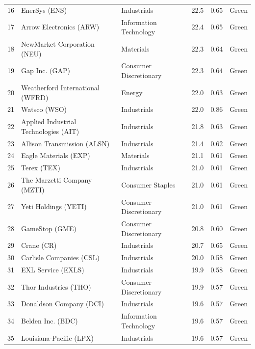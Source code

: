 \documentclass[11pt,a4paper]{article}
\begin{document}
{\begin{longtable}{r p{4.6cm} p{3cm} r r l}
16 & EnerSys (ENS) & Industrials & 22.5 & 0.65 & \cellcolor[HTML]{C6EFCE}Green \\
17 & Arrow Electronics (ARW) & Information Technology & 22.4 & 0.65 & \cellcolor[HTML]{C6EFCE}Green \\
18 & NewMarket Corporation (NEU) & Materials & 22.3 & 0.64 & \cellcolor[HTML]{C6EFCE}Green \\
19 & Gap Inc. (GAP) & Consumer Discretionary & 22.3 & 0.64 & \cellcolor[HTML]{C6EFCE}Green \\
20 & Weatherford International (WFRD) & Energy & 22.0 & 0.63 & \cellcolor[HTML]{C6EFCE}Green \\
21 & Watsco (WSO) & Industrials & 22.0 & 0.86 & \cellcolor[HTML]{C6EFCE}Green \\
22 & Applied Industrial Technologies (AIT) & Industrials & 21.8 & 0.63 & \cellcolor[HTML]{C6EFCE}Green \\
23 & Allison Transmission (ALSN) & Industrials & 21.4 & 0.62 & \cellcolor[HTML]{C6EFCE}Green \\
24 & Eagle Materials (EXP) & Materials & 21.1 & 0.61 & \cellcolor[HTML]{C6EFCE}Green \\
25 & Terex (TEX) & Industrials & 21.0 & 0.61 & \cellcolor[HTML]{C6EFCE}Green \\
26 & The Marzetti Company (MZTI) & Consumer Staples & 21.0 & 0.61 & \cellcolor[HTML]{C6EFCE}Green \\
27 & Yeti Holdings (YETI) & Consumer Discretionary & 21.0 & 0.61 & \cellcolor[HTML]{C6EFCE}Green \\
28 & GameStop (GME) & Consumer Discretionary & 20.8 & 0.60 & \cellcolor[HTML]{C6EFCE}Green \\
29 & Crane (CR) & Industrials & 20.7 & 0.65 & \cellcolor[HTML]{C6EFCE}Green \\
30 & Carlisle Companies (CSL) & Industrials & 20.0 & 0.58 & \cellcolor[HTML]{C6EFCE}Green \\
31 & EXL Service (EXLS) & Industrials & 19.9 & 0.58 & \cellcolor[HTML]{C6EFCE}Green \\
32 & Thor Industries (THO) & Consumer Discretionary & 19.9 & 0.57 & \cellcolor[HTML]{C6EFCE}Green \\
33 & Donaldson Company (DCI) & Industrials & 19.6 & 0.57 & \cellcolor[HTML]{C6EFCE}Green \\
34 & Belden Inc. (BDC) & Information Technology & 19.6 & 0.57 & \cellcolor[HTML]{C6EFCE}Green \\
35 & Louisiana-Pacific (LPX) & Industrials & 19.6 & 0.57 & \cellcolor[HTML]{C6EFCE}Green \\

\end{longtable}}
\end{document}
